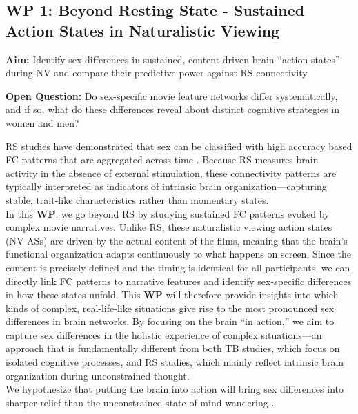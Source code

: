 \documentclass[11pt,a4paper]{article}
\begin{document}
\subsection*{WP 1: Beyond Resting State - Sustained Action States in Naturalistic Viewing}

\textbf{Aim:} Identify sex differences in sustained, content-driven brain “action states” during NV 
and compare their predictive power against RS connectivity.

\textbf{Open Question:} Do sex-specific movie feature networks differ systematically, and if so, 
what do these differences reveal about distinct cognitive strategies in women and men?  

RS studies have demonstrated that sex can be classified with high accuracy based FC patterns that are 
aggregated across time \parencite{casanovaCombiningGraphMachine2012a,ritchieSexDifferencesAdult2018,weisSexClassificationResting2020a,wierschAccurateSexPrediction2023a,wierschSexDifferencesBrain2021a}. 
Because RS measures brain activity in the absence of external stimulation, these connectivity patterns are 
typically interpreted as indicators of intrinsic brain organization—capturing stable, trait-like characteristics 
rather than momentary states.\\
In this \textbf{WP}, we go beyond RS by studying sustained FC patterns evoked by complex movie narratives. 
Unlike RS, these naturalistic viewing action states (NV-ASs) are driven by the actual content of the films, 
meaning that the brain's functional organization adapts continuously to what happens on screen. Since the content is precisely 
defined and the timing is identical for all participants, we can directly link FC patterns to narrative features and identify
sex-specific differences in how these states unfold. This \textbf{WP} will therefore provide insights into which kinds of complex, 
real-life-like situations give rise to the most pronounced sex differences in brain networks. By focusing on the brain “in action,” 
we aim to capture sex differences in the holistic experience of complex situations—an approach that is fundamentally different 
from both TB studies, which focus on isolated cognitive processes, and RS studies, which mainly reflect 
intrinsic brain organization during unconstrained thought. \\
We hypothesize that putting the brain into action will bring sex differences into sharper relief 
than the unconstrained state of mind wandering \parencite{vanderwalIndividualDifferencesFunctional2017}.\\
\end{document}
